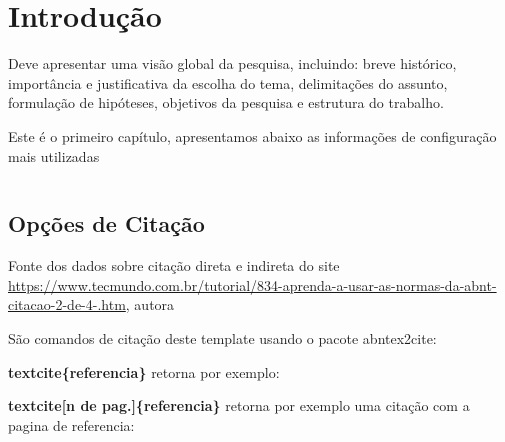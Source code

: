 



\chapter{Introdução}
\label{cap:introducao}

Deve apresentar uma visão global da pesquisa, incluindo: breve histórico, importância e justificativa da escolha do tema, delimitações do assunto, formulação de hipóteses, objetivos da pesquisa e estrutura do trabalho.


Este \'e o primeiro cap\'itulo, apresentamos abaixo as informações de configuração mais utilizadas 

\begin{equation}
  [E = mc^2]
  \end{equation}



\section{Opções de Citação}
\label{sec:citacoes}

Fonte dos dados sobre citação direta e indireta do site \url{https://www.tecmundo.com.br/tutorial/834-aprenda-a-usar-as-normas-da-abnt-citacao-2-de-4-.htm}, autora \textcite{xavier2020}

São comandos de citação deste template usando o pacote abntex2cite:

\textbf{textcite\{referencia\}} retorna por exemplo: \textcite{kitchenham2009systematic}

\textbf{textcite[n de pag.]\{referencia\}}  retorna por exemplo uma citação com a pagina de referencia: \textcite[p.20]{kitchenham2009systematic}

